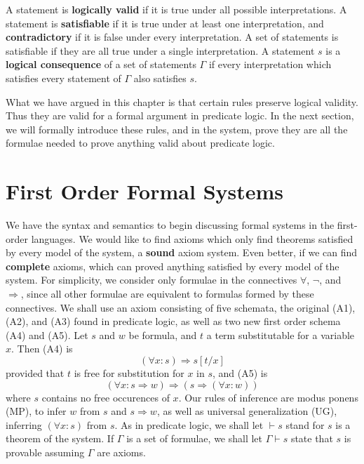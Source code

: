 A statement is {\bf logically valid} if it is true under all possible interpretations. A statement is {\bf satisfiable} if it is true under at least one interpretation, and {\bf contradictory} if it is false under every interpretation. A set of statements is satisfiable if they are all true under a single interpretation. A statement $s$ is a {\bf logical consequence} of a set of statements $\Gamma$ if every interpretation which satisfies every statement of $\Gamma$ also satisfies $s$.

What we have argued in this chapter is that certain rules preserve logical validity. Thus they are valid for a formal argument in predicate logic. In the next section, we will formally introduce these rules, and in the system, prove they are all the formulae needed to prove anything valid about predicate logic.






\section{First Order Formal Systems}

We have the syntax and semantics to begin discussing formal systems in the first-order languages. We would like to find axioms which only find theorems satisfied by every model of the system, a {\bf sound} axiom system. Even better, if we can find {\bf complete} axioms, which can proved anything satisfied by every model of the system. For simplicity, we consider only formulae in the connectives $\forall$, $\neg$, and $\Rightarrow$, since all other formulae are equivalent to formulas formed by these connectives. We shall use an axiom consisting of five schemata, the original (A1), (A2), and (A3) found in predicate logic, as well as two new first order schema (A4) and (A5). Let $s$ and $w$ be formula, and $t$ a term substitutable for a variable $x$. Then (A4) is
%
\[ (\forall x: s) \Rightarrow s[t/x] \]
%
provided that $t$ is free for substitution for $x$ in $s$, and (A5) is
%
\[ (\forall x: s \Rightarrow w) \Rightarrow (s \Rightarrow (\forall x: w)) \]
%
where $s$ contains no free occurences of $x$. Our rules of inference are modus ponens (MP), to infer $w$ from $s$ and $s \Rightarrow w$, as well as universal generalization (UG), inferring $(\forall x: s)$ from $s$. As in predicate logic, we shall let $\vdash s$ stand for $s$ is a theorem of the system. If $\Gamma$ is a set of formulae, we shall let $\Gamma \vdash s$ state that $s$ is provable assuming $\Gamma$ are axioms.


